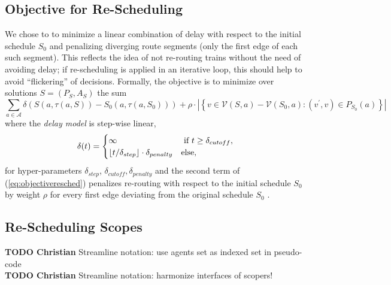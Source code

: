\documentclass{article}
\DeclarePairedDelimiter{\floor}{\lfloor}{\rfloor}
\begin{document}
\subsection{Objective for Re-Scheduling}
We chose to to minimize a linear combination of delay with respect to the initial schedule $S_0$ and penalizing diverging route segments (only the first edge of each such segment). This reflects the idea of not re-routing trains without the need of avoiding delay; if re-scheduling is applied in an iterative loop, this should help to avoid ``flickering'' of decisions.
%
Formally, the objective is to minimize over solutions $S=(P_S,A_S)$  the sum
\begin{equation}
\sum_{a \in \mathcal{A}} \delta\left(S(a,\tau(a,S)) - S_0(a,\tau(a, S_0))\right) + \rho \cdot \left|\left\{v \in \mathcal{V}(S,a)-\mathcal{V}(S_0,a): (v^\prime,v) \in P_{S_0}(a) \right\}\right| \label{eq:objectiveresched}
\end{equation}
where the \emph{delay model} is step-wise linear,
\begin{equation}
\delta(t) =
\begin{cases}
    \infty & \textrm{ if } t \geq \delta_{cutoff},\\
    \floor{t / \delta_{step}} \cdot \delta_{penalty}  & \textrm{else},
\end{cases}
\end{equation}
for hyper-parameters $\delta_{step}$, $\delta_{cutoff}, \delta_{penalty}$
and the second term of (\ref{eq:objectiveresched}) penalizes re-routing with respect to the initial schedule $S_0$ by weight $\rho$ for every first edge deviating from the original schedule $S_0$ .


\subsection{Re-Scheduling Scopes}

\begin{mdframed}
\textbf{TODO Christian} Streamline notation: use agents set as indexed set in pseudo-code\\
\textbf{TODO Christian} Streamline notation: harmonize interfaces of scopers!\\
\end{mdframed}
\end{document}
